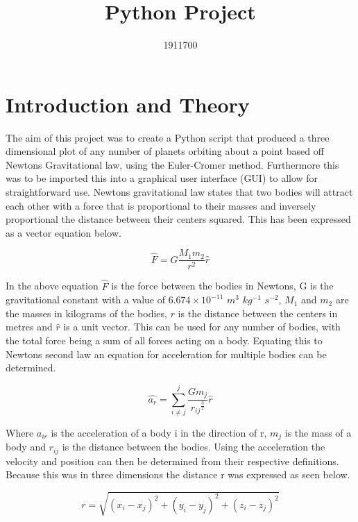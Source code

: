 \documentclass[11pt]{article}
\title{Python Project}
\author{1911700}
\date{}
\begin{document}
\maketitle
\section{Introduction and Theory \label{sec:Introduction and Theory}}

The aim of this project was to create a Python script that produced a three dimensional plot of any number of planets orbiting about a point based off Newtons Gravitational law, using the Euler-Cromer method. Furthermore this was to be imported this into a graphical user interface (GUI) to allow for straightforward use. Newtons gravitational law states that two bodies will attract each other with a force that is proportional to their masses and inversely proportional the distance between their centers squared. This has been expressed as a vector equation below.

\begin{equation}
\label{eqn:FirstEqn}										
\hat{F} = G\frac{M_1m_2}{r^2}\hat{r}						
\end{equation}

In the above equation $\hat{F}$ is the force between the bodies in Newtons, G is the gravitational constant with a value of ${6.674}\times{10^{-11}}$ $m^3$ $kg^{-1}$ $s^{-2}$, $M_1$ and $m_2$ are the masses in kilograms of the bodies, $r$ is the distance between the centers in metres and $\hat{r}$ is a unit vector. This can be used for any number of bodies, with the total force being a sum of all forces acting on a body. Equating this to Newtons second law an equation for acceleration for multiple bodies can be determined.

\begin{equation}
\label{eqn:SecondEqn}									
\hat{a_{r}} = \sum\limits_{i\neq{j}}^j\frac{Gm_j}{{r_{ij}}^\frac{3}{2}}\hat{r}
\end{equation}

Where $a_{ir}$ is the acceleration of a body i in the direction of r, $m_j$ is the mass of a body and $r_{ij}$ is the distance between the bodies. Using the acceleration the velocity and position can then be determined from their respective definitions. Because this was in three dimensions the distance r was expressed as seen below.

\begin{equation}
\label{eqn:ThirdEqn}									
r = \sqrt{{({x_i}-{x_j})^2}+{({y_i}-{y_j})^2}+{({z_i}-{z_j})^2}}
\end{equation}
\end{document}
